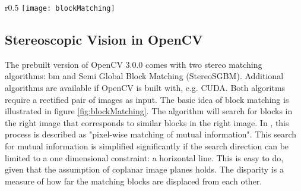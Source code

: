 \begin{wrapfigure}{r}{0.5\textwidth}
	\vspace{-10pt} %
	\centering
	\texttt{[image: blockMatching]}
	\caption{Block matching along the epipolar line.}
	\label{fig:blockMatching}
\end{wrapfigure}

\subsection{Stereoscopic Vision in OpenCV}

The prebuilt version of OpenCV 3.0.0 comes with two stereo matching algorithms: \gls{bm} and Semi Global Block Matching (StereoSGBM)\cite{hirschmullerstereo}. Additional algorithms are available if OpenCV is built with, e.g. CUDA. Both algoritms require a rectified pair of images as input. The basic idea of block matching is illustrated in figure \ref{fig:blockMatching}. The algorithm will search for blocks in the right image that corresponds to similar blocks in the right image. In \cite{hirschmullerstereo}, this process is described as "pixel-wise matching of mutual information". This search for mutual information is simplified significantly if the search direction can be limited to a one dimensional constraint: a horizontal line. This is easy to do, given that the assumption of coplanar image planes holds. The disparity is a measure of how far the matching blocks are displaced from each other. 
